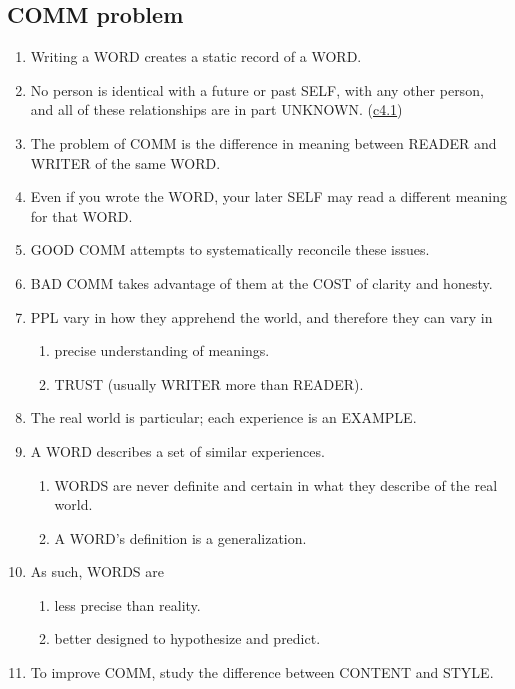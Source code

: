 \documentclass[
]{book}
\providecommand{\tightlist}{%
  \setlength{\itemsep}{0pt}\setlength{\parskip}{0pt}}
\begin{document}
\hypertarget{comm-problem}{%
\subsection{COMM problem}\label{comm-problem}}

\begin{enumerate}
\def\labelenumi{\arabic{enumi}.}
\setcounter{enumi}{46}
\tightlist
\item
  Writing a WORD creates a static record of a WORD.
\item
  No person is identical with a future or past SELF, with any other
  person, and all of these relationships are in part UNKNOWN. (\protect\hyperlink{ppl}{c4.1})
\item
  The problem of COMM is the difference in meaning between READER
  and WRITER of the same WORD.
\item
  Even if you wrote the WORD, your later SELF may read a different
  meaning for that WORD.
\item
  GOOD COMM attempts to systematically reconcile these issues.
\item
  BAD COMM takes advantage of them at the COST of clarity and
  honesty.
\item
  PPL vary in how they apprehend the world, and therefore they can vary in

  \begin{enumerate}
  \def\labelenumii{\arabic{enumii}.}
  \tightlist
  \item
    precise understanding of meanings.
  \item
    TRUST (usually WRITER more than READER).
  \end{enumerate}
\item
  The real world is particular; each experience is an EXAMPLE.
\item
  A WORD describes a set of similar experiences.

  \begin{enumerate}
  \def\labelenumii{\arabic{enumii}.}
  \tightlist
  \item
    WORDS are never definite and certain in what they describe of the real world.
  \item
    A WORD's definition is a generalization.
  \end{enumerate}
\item
  As such, WORDS are

  \begin{enumerate}
  \def\labelenumii{\arabic{enumii}.}
  \tightlist
  \item
    less precise than reality.
  \item
    better designed to hypothesize and predict.
  \end{enumerate}
\item
  To improve COMM, study the difference between CONTENT and STYLE.
\end{enumerate}
\end{document}
